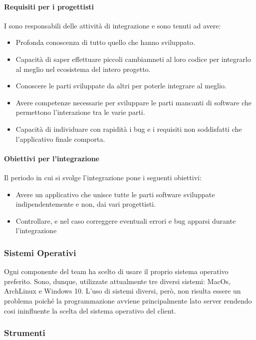 \paragraph{Requisiti per i progettisti}
I \textit{\ProgP} sono responsabili delle attività di integrazione e sono tenuti ad avere:
\begin{itemize}
\item
Profonda conoscenza di tutto quello che hanno sviluppato.
\item
Capacità di saper effettuare piccoli cambiamneti al loro codice per integrarlo al meglio nel ecosistema del intero progetto.
\item
Conoscere le parti sviluppate da altri per poterle integrare al meglio.
\item
Avere competenze necessarie per sviluppare le parti mancanti di software che permettono l'interazione tra le varie parti.
\item
Capacità di individuare con rapidità i bug e i requisiti non soddisfatti che l'applicativo finale comporta.
\end{itemize}

\paragraph{Obiettivi per l'integrazione}
Il periodo in cui si svolge l'integrazione pone i seguenti obiettivi:
\begin{itemize}
\item Avere un applicativo che unisce tutte le parti software sviluppate indipendentemente e non, dai vari progettisti.
\item Controllare, e nel caso correggere eventuali errori e bug apparsi durante l'integrazione
\end{itemize}

\subsubsection{Sistemi Operativi}
Ogni componente del team ha scelto di usare il proprio sistema operativo preferito. Sono, dunque, utilizzate attualmente tre diversi sistemi: MacOs,  ArchLinux e Windows 10. L'uso di sistemi diversi, però, non risulta essere un problema poiché la programmazione avviene principalmente lato server rendendo cosi ininfluente la scelta del sistema operativo del client.

\subsubsection{Strumenti}
